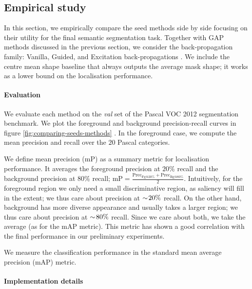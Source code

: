 \documentclass[british,10pt,twocolumn,letterpaper]{article}
\begin{document}
\subsection{Empirical study}

 \noindent In this section, we empirically compare the seed methods
 side by side focusing on their utility for the final semantic segmentation
 task. Together with GAP methods discussed in the previous section,
 we consider the back-propagation family: Vanilla, Guided, and Excitation
 back-propagations \cite{Simonyan2014Iclr,Springenberg2015Iclrw,Zhang2016Eccv}.
 We include the centre mean shape baseline that always outputs the
 average mask shape; it works as a lower bound on the localisation
 performance.
 
 \paragraph{Evaluation}
 
 We evaluate each method on the \emph{val} set of the Pascal VOC 2012
 \cite{pascal-voc-2012} segmentation benchmark. We plot the foreground
 and background precision-recall curves in figure \ref{fig:comparing-seeds-methods}     .
 In the foreground case, we compute the mean precision and recall over
 the $20$ Pascal categories.
 
 We define mean precision (mP) as a summary metric for localisation
 performance. It averages the foreground precision at $20\%$ recall
 and the background precision at $80\%$ recall; $\mathrm{mP}=\frac{\mathrm{Prec}_{\mathrm{Fg}@20\%}+\mathrm{Prec}_{\mathrm{Bg}@80\%}}{2}$.
 Intuitively, for the foreground region we only need a small discriminative
 region, as saliency will fill in the extent; we thus care about precision
 at $\sim\negthinspace20\%$ recall. On the other hand, background
 has more diverse appearance and usually takes a larger region; we
 thus care about precision at $\sim\negthinspace80\%$ recall. Since
 we care about both, we take the average (as for the mAP metric). This
 metric has shown a good correlation with the final performance in
 our preliminary experiments.
 
 We measure the classification performance in the standard mean average
 precision (mAP) metric. 
 
 \paragraph{Implementation details}
 
\end{document}
